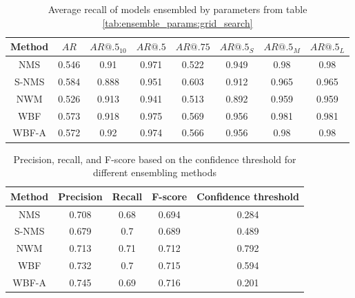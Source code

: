 \begin{table}[h]
    \centering
    \begin{tabular}{|c|c|c|c|c|c|c|c|}
        \hline
        Method & $AR$  & $AR@.5_{10}$ & $AR@.5$ & $AR@.75$ & $AR@.5_S$ & $AR@.5_M$ & $AR@.5_L$ \\ \hline
        NMS    & 0.546 & 0.91         & 0.971   & 0.522    & 0.949     & 0.98      & 0.98      \\ \hline
        S-NMS  & 0.584 & 0.888        & 0.951   & 0.603    & 0.912     & 0.965     & 0.965     \\ \hline
        NWM    & 0.526 & 0.913        & 0.941   & 0.513    & 0.892     & 0.959     & 0.959     \\ \hline
        WBF    & 0.573 & 0.918        & 0.975   & 0.569    & 0.956     & 0.981     & 0.981     \\ \hline
        WBF-A  & 0.572 & 0.92         & 0.974   & 0.566    & 0.956     & 0.98      & 0.98      \\ \hline
    \end{tabular}
    \caption{Average recall of models ensembled by parameters from table \ref{tab:ensemble_params:grid_search}}
    \label{tab:recall:grid_search}
\end{table}


\begin{table}[h]
    \begin{tabular}{|c|c|c|c|c|}
        \hline
        Method & Precision & Recall & F-score & Confidence threshold \\ \hline
        NMS    & 0.708     & 0.68   & 0.694   & 0.284                \\ \hline
        S-NMS  & 0.679     & 0.7    & 0.689   & 0.489                \\ \hline
        NWM    & 0.713     & 0.71   & 0.712   & 0.792                \\ \hline
        WBF    & 0.732     & 0.7    & 0.715   & 0.594                \\ \hline
        WBF-A  & 0.745     & 0.69   & 0.716   & 0.201                \\ \hline
    \end{tabular}
    \caption{Precision, recall, and F-score based on the confidence threshold for different ensembling methods}
    \label{tab:ensembling_prf:grid_search}
\end{table}

